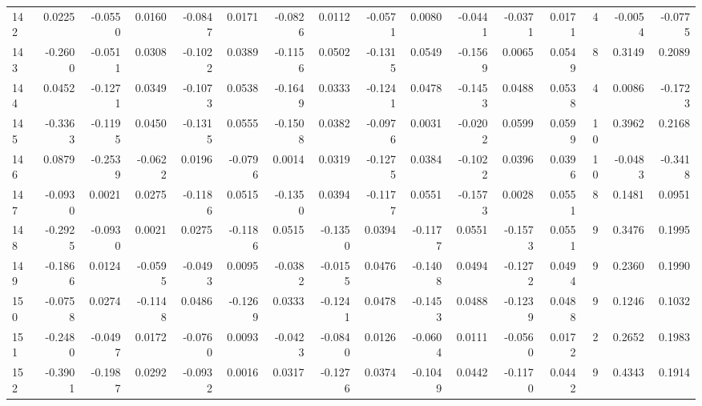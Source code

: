 \begin{tabular}{lrrrrrrrrrrrrrrr}
142 &      0.0225 & -0.0550 &  0.0160 & -0.0847 &  0.0171 & -0.0826 &  0.0112 & -0.0571 &  0.0080 & -0.0441 &  -0.0371 &     0.0171 &      4 &                   -0.0054 &                    -0.0775 \\
143 &     -0.2600 & -0.0511 &  0.0308 & -0.1022 &  0.0389 & -0.1156 &  0.0502 & -0.1315 &  0.0549 & -0.1569 &   0.0065 &     0.0549 &      8 &                    0.3149 &                     0.2089 \\
144 &      0.0452 & -0.1271 &  0.0349 & -0.1073 &  0.0538 & -0.1649 &  0.0333 & -0.1241 &  0.0478 & -0.1453 &   0.0488 &     0.0538 &      4 &                    0.0086 &                    -0.1723 \\
145 &     -0.3363 & -0.1195 &  0.0450 & -0.1315 &  0.0555 & -0.1508 &  0.0382 & -0.0976 &  0.0031 & -0.0202 &   0.0599 &     0.0599 &     10 &                    0.3962 &                     0.2168 \\
146 &      0.0879 & -0.2539 & -0.0622 &  0.0196 & -0.0796 &  0.0014 &  0.0319 & -0.1275 &  0.0384 & -0.1022 &   0.0396 &     0.0396 &     10 &                   -0.0483 &                    -0.3418 \\
147 &     -0.0930 &  0.0021 &  0.0275 & -0.1186 &  0.0515 & -0.1350 &  0.0394 & -0.1177 &  0.0551 & -0.1573 &   0.0028 &     0.0551 &      8 &                    0.1481 &                     0.0951 \\
148 &     -0.2925 & -0.0930 &  0.0021 &  0.0275 & -0.1186 &  0.0515 & -0.1350 &  0.0394 & -0.1177 &  0.0551 &  -0.1573 &     0.0551 &      9 &                    0.3476 &                     0.1995 \\
149 &     -0.1866 &  0.0124 & -0.0595 & -0.0493 &  0.0095 & -0.0382 & -0.0155 &  0.0476 & -0.1408 &  0.0494 &  -0.1272 &     0.0494 &      9 &                    0.2360 &                     0.1990 \\
150 &     -0.0758 &  0.0274 & -0.1148 &  0.0486 & -0.1269 &  0.0333 & -0.1241 &  0.0478 & -0.1453 &  0.0488 &  -0.1239 &     0.0488 &      9 &                    0.1246 &                     0.1032 \\
151 &     -0.2480 & -0.0497 &  0.0172 & -0.0760 &  0.0093 & -0.0423 & -0.0840 &  0.0126 & -0.0604 &  0.0111 &  -0.0560 &     0.0172 &      2 &                    0.2652 &                     0.1983 \\
152 &     -0.3901 & -0.1987 &  0.0292 & -0.0932 &  0.0016 &  0.0317 & -0.1276 &  0.0374 & -0.1049 &  0.0442 &  -0.1170 &     0.0442 &      9 &                    0.4343 &                     0.1914 \\

\end{tabular}
